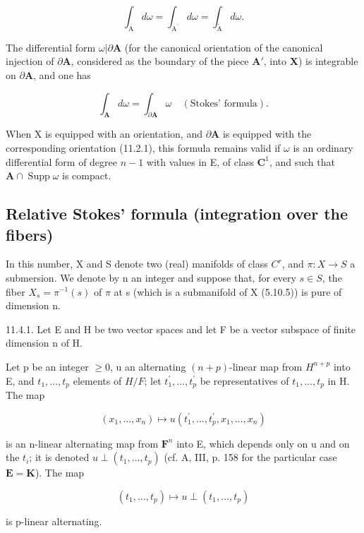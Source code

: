 \[
\int_ {\mathrm{A}} d \omega = \int_ {\mathrm{A} ^ {\prime}} d \omega = \int_ {\mathring{\mathrm{A}}} d \omega.
\]

The differential form \(\omega|\partial\mathbf{A}\) (for the canonical orientation of the canonical injection of \(\partial\mathbf{A}\), considered as the boundary of the piece \(\mathbf{A}'\), into \(\mathbf{X}\)) is integrable on \(\partial\mathbf{A}\), and one has

\[
\int_ {\mathbf {A}} d \omega = \int_ {\partial \mathbf {A}} \omega \quad (\text{Stokes' formula}).
\]

When X is equipped with an orientation, and \(\partial\mathbf{A}\) is equipped with the corresponding orientation (11.2.1), this formula remains valid if \(\omega\) is an ordinary differential form of degree \(n-1\) with values in E, of class \(\mathbf{C}^{1}\), and such that \(\mathbf{A}\cap\operatorname{Supp}\omega\) is compact.

\subsection{Relative Stokes' formula (integration over the fibers)}

In this number, X and S denote two (real) manifolds of class \(C^{r}\), and \(\pi: X \to S\) a submersion. We denote by n an integer and suppose that, for every \(s \in S\), the fiber \(X_{s} = \pi^{-1}(s)\) of \(\pi\) at s (which is a submanifold of X (5.10.5)) is pure of dimension n.

11.4.1. Let E and H be two vector spaces and let F be a vector subspace of finite dimension n of H.

Let p be an integer \(\geqslant0\), u an alternating \((n+p)\)-linear map from \(H^{n+p}\) into E, and \(t_{1},\ldots,t_{p}\) elements of \(H/F\); let \(t_{1}^{\prime},\ldots,t_{p}^{\prime}\) be representatives of \(t_{1},\ldots,t_{p}\) in H. The map

\[
(x _ {1}, \dots , x _ {n}) \mapsto u (t _ {1} ^ {\prime}, \dots , t _ {p} ^ {\prime}, x _ {1}, \dots , x _ {n})
\]

is an n-linear alternating map from \(\mathbf{F}^n\) into E, which depends only on u and on the \(t_i\); it is denoted \(u \perp (t_1, \ldots, t_p)\) (cf. A, III, p. 158 for the particular case \(\mathbf{E} = \mathbf{K}\)). The map

\[
\left(t _ {1}, \dots , t _ {p}\right) \mapsto u \perp \left(t _ {1}, \dots , t _ {p}\right)
\]

is p-linear alternating.

